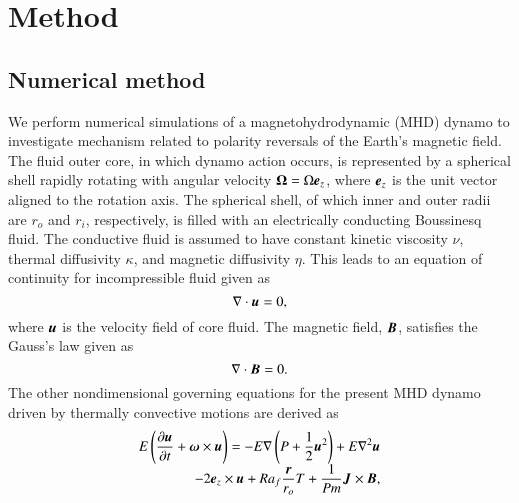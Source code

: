 \section{Method}
\label{section:method}

\subsection{Numerical method}

We perform numerical simulations of a magnetohydrodynamic (MHD) dynamo to investigate  mechanism related to polarity reversals of the Earth's magnetic field.
The fluid outer core, in which dynamo action occurs, is represented by a spherical shell rapidly rotating with angular velocity ${\bf \Omega} = \Omega \mbox{\boldmath$e$}_z$, where $\mbox{\boldmath$e$}_z$ is the unit vector aligned to the rotation axis.
The spherical shell, of which inner and outer radii are $r_o$ and $r_i$, respectively, is filled with an electrically conducting Boussinesq fluid. 
{\color{blue}
The conductive fluid is assumed to have constant kinetic viscosity $\nu$, thermal diffusivity $\kappa$, and magnetic diffusivity $\eta$.
}
This leads to an equation of continuity for incompressible fluid given as
%
\begin{equation}
\nabla \cdot \mbox{\boldmath$u$} = 0,
\label{eq:divu=0}
\end{equation}
%
where $\mbox{\boldmath$u$}$ is the velocity field of core fluid.
The magnetic field, $\mbox{\boldmath$B$}$, satisfies the Gauss's law %
given as
%
\begin{equation}
\nabla \cdot \mbox{\boldmath$B$} = 0.
\label{eq:divB=0}
\end{equation}
%
The other nondimensional governing equations for the present MHD dynamo driven by thermally convective motions are derived as
%
\begin{equation}
\begin{array}{l}
\displaystyle
E \left( \frac{\partial\bvec{u}}{\partial t} +
 \bvec{\omega} \times \bvec{u} \right) =
 - E \nabla \left( P + \frac{1}{2} \bvec{u}^2 \right)
 + E \nabla^2 \bvec{u}
\\
\displaystyle
\hspace*{\fill}
 -2 \bvec{e}_z \times \bvec{u}
 + Ra_f \frac{\bvec{r}}{r_o} T
 + \frac{1}{Pm} \bvec{J} \times \bvec{B} ,
\end{array}
\label{eq:momentum}
\end{equation}
